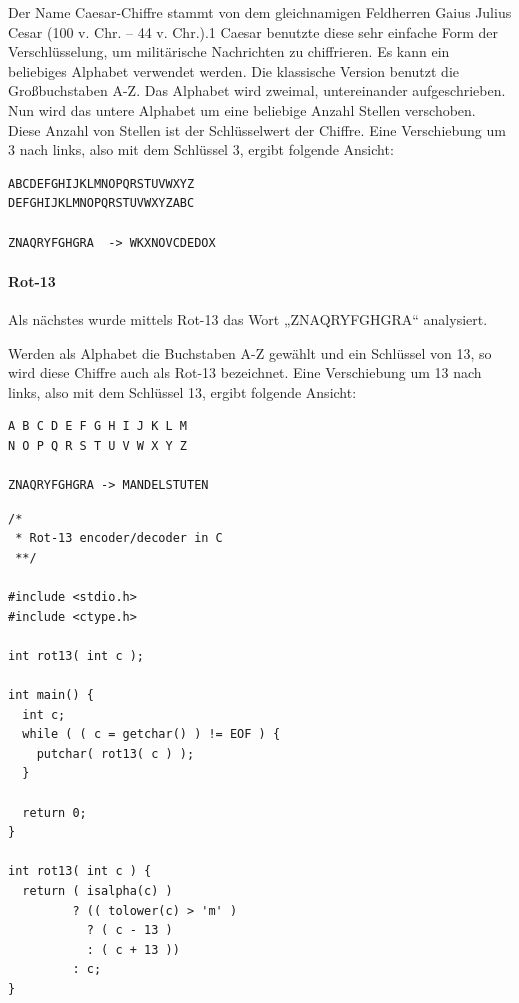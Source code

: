 Der Name Caesar-Chiffre stammt von dem gleichnamigen Feldherren Gaius Julius
Cesar (100 v. Chr. – 44 v. Chr.).1 Caesar benutzte diese sehr einfache Form der
Verschlüsselung, um militärische Nachrichten zu chiffrieren.  Es kann ein
beliebiges Alphabet verwendet werden. Die klassische Version benutzt die
Großbuchstaben A-Z. Das Alphabet wird zweimal, untereinander aufgeschrieben.
Nun wird das untere Alphabet um eine beliebige Anzahl Stellen verschoben. Diese
Anzahl von Stellen ist der Schlüsselwert der Chiffre. Eine Verschiebung um 3
nach links, also mit dem Schlüssel 3, ergibt folgende Ansicht:

\begin{lstlisting}
ABCDEFGHIJKLMNOPQRSTUVWXYZ
DEFGHIJKLMNOPQRSTUVWXYZABC

ZNAQRYFGHGRA  -> WKXNOVCDEDOX
\end{lstlisting}

\paragraph{Rot-13}

Als nächstes wurde mittels Rot-13 das Wort „ZNAQRYFGHGRA“ analysiert.

Werden als Alphabet die Buchstaben A-Z gewählt und ein Schlüssel von 13, so wird
diese Chiffre auch als Rot-13 bezeichnet. Eine Verschiebung um 13 nach links,
also mit dem Schlüssel 13, ergibt folgende Ansicht:

\begin{lstlisting}
A B C D E F G H I J K L M
N O P Q R S T U V W X Y Z

ZNAQRYFGHGRA -> MANDELSTUTEN
\end{lstlisting}

\begin{lstlisting}[caption=Quellcode rot13.c]
/*
 * Rot-13 encoder/decoder in C
 **/

#include <stdio.h>
#include <ctype.h>

int rot13( int c );

int main() {
  int c;
  while ( ( c = getchar() ) != EOF ) {
    putchar( rot13( c ) );
  }

  return 0;
}

int rot13( int c ) {
  return ( isalpha(c) )
         ? (( tolower(c) > 'm' )
           ? ( c - 13 )
           : ( c + 13 ))
         : c;
}
\end{lstlisting}

